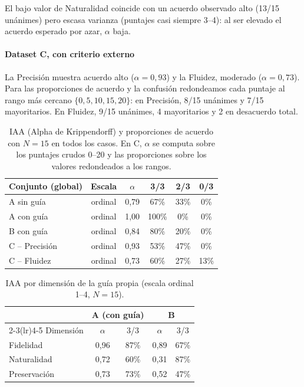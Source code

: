 El bajo valor de Naturalidad coincide con un acuerdo observado alto
(13/15 unánimes) pero escasa varianza (puntajes casi siempre 3--4): al ser elevado
el acuerdo esperado por azar, $\alpha$ baja.


\paragraph{Dataset C, con criterio externo}

La Precisión muestra acuerdo alto ($\alpha=0{,}93$) y la Fluidez, moderado ($\alpha=0{,}73$). Para las
proporciones de acuerdo y la confusión redondeamos cada puntaje al rango más
cercano $\{0,5,10,15,20\}$: en Precisión, 8/15 unánimes y 7/15 mayoritarios. 
En Fluidez, 9/15 unánimes, 4 mayoritarios y 2 en desacuerdo total. 

\begin{table}[t]
\centering
\small
\begin{tabular}{lccccc}
\toprule
Conjunto (global) & Escala & $\alpha$ & 3/3 & 2/3 & 0/3 \\
\midrule
A sin guía       & ordinal & 0{,}79 & 67\% & 33\% & 0\% \\
A con guía       & ordinal & 1{,}00 & 100\% & 0\% & 0\% \\
B con guía       & ordinal & 0{,}84 & 80\% & 20\% & 0\% \\
C -- Precisión   & ordinal & 0{,}93 & 53\% & 47\% & 0\% \\
C -- Fluidez     & ordinal & 0{,}73 & 60\% & 27\% & 13\% \\
\bottomrule
\end{tabular}
\caption{IAA (Alpha de Krippendorff) y proporciones de acuerdo con $N=15$ en todos los casos. En C,
$\alpha$ se computa sobre los puntajes crudos 0--20 y las proporciones sobre los
valores redondeados a los rangos.}
\label{tab:iaa}
\end{table}

\begin{table}[t]
\centering
\small
\begin{tabular}{lcccc}
\toprule
 & \multicolumn{2}{c}{A (con guía)} & \multicolumn{2}{c}{B} \\
\cmidrule(lr){2-3}\cmidrule(lr){4-5}
Dimensión & $\alpha$ & 3/3 & $\alpha$ & 3/3 \\
\midrule
Fidelidad    & 0{,}96 & 87\% & 0{,}89 & 67\% \\
Naturalidad  & 0{,}72 & 60\% & 0{,}31 & 87\% \\
Preservación & 0{,}73 & 73\% & 0{,}52 & 47\% \\
\bottomrule
\end{tabular}
\caption{IAA por dimensión de la guía propia (escala ordinal 1--4, $N=15$).}
\label{tab:dims}
\end{table}

